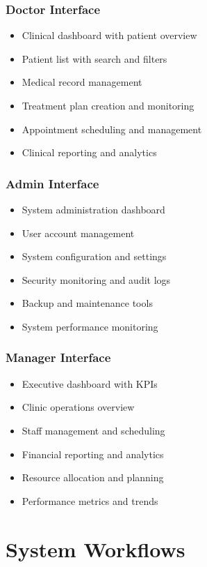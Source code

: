 \documentclass[12pt,a4paper]{article}
\begin{document}
\subsubsection{Doctor Interface}
\begin{itemize}
    \item Clinical dashboard with patient overview
    \item Patient list with search and filters
    \item Medical record management
    \item Treatment plan creation and monitoring
    \item Appointment scheduling and management
    \item Clinical reporting and analytics
\end{itemize}

\subsubsection{Admin Interface}
\begin{itemize}
    \item System administration dashboard
    \item User account management
    \item System configuration and settings
    \item Security monitoring and audit logs
    \item Backup and maintenance tools
    \item System performance monitoring
\end{itemize}

\subsubsection{Manager Interface}
\begin{itemize}
    \item Executive dashboard with KPIs
    \item Clinic operations overview
    \item Staff management and scheduling
    \item Financial reporting and analytics
    \item Resource allocation and planning
    \item Performance metrics and trends
\end{itemize}

\section{System Workflows}
\end{document}
